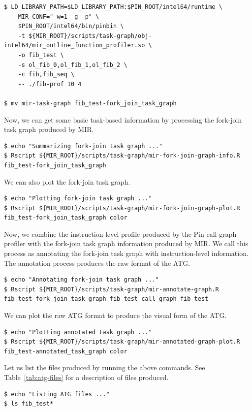 \documentclass[11pt,a4paper,notitlepage]{article}
\begin{document}
\begin{lstlisting}[style=BashInputStyle]
$ LD_LIBRARY_PATH=$LD_LIBRARY_PATH:$PIN_ROOT/intel64/runtime \
    MIR_CONF="-w=1 -g -p" \
    $PIN_ROOT/intel64/bin/pinbin \
    -t ${MIR_ROOT}/scripts/task-graph/obj-intel64/mir_outline_function_profiler.so \
    -o fib_test \
    -s ol_fib_0,ol_fib_1,ol_fib_2 \
    -c fib,fib_seq \
    -- ./fib-prof 10 4

$ mv mir-task-graph fib_test-fork_join_task_graph
\end{lstlisting}

Now, we can get some basic task-based information by processing the fork-join task graph produced by MIR.
\begin{lstlisting}[style=BashInputStyle]
$ echo "Summarizing fork-join task graph ..."
$ Rscript ${MIR_ROOT}/scripts/task-graph/mir-fork-join-graph-info.R fib_test-fork_join_task_graph 
\end{lstlisting}

We can also plot the fork-join task graph. 
\begin{lstlisting}[style=BashInputStyle]
$ echo "Plotting fork-join task graph ..."
$ Rscript ${MIR_ROOT}/scripts/task-graph/mir-fork-join-graph-plot.R fib_test-fork_join_task_graph color
\end{lstlisting}

Now, we combine the instruction-level profile produced by the Pin call-graph profiler with the fork-join task graph information produced by MIR. We call this process as annotating the fork-join task graph with instruction-level information. The annotation process produces the raw format of the ATG.

\begin{lstlisting}[style=BashInputStyle]
$ echo "Annotating fork-join task graph ..."
$ Rscript ${MIR_ROOT}/scripts/task-graph/mir-annotate-graph.R fib_test-fork_join_task_graph fib_test-call_graph fib_test
\end{lstlisting}

We can plot the raw ATG format to produce the visual form of the ATG.
\begin{lstlisting}[style=BashInputStyle]
$ echo "Plotting annotated task graph ..."
$ Rscript ${MIR_ROOT}/scripts/task-graph/mir-annotated-graph-plot.R fib_test-annotated_task_graph color
\end{lstlisting}

Let us list the files produced by running the above commands. See Table~\ref{tab:atg-files} for a description of files produced.
\begin{lstlisting}[style=BashInputStyle]
$ echo "Listing ATG files ..."
$ ls fib_test*
\end{lstlisting}
\end{document}
